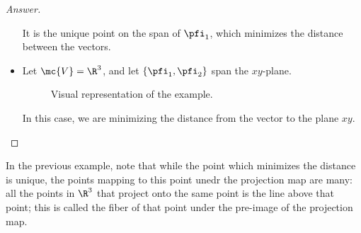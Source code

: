 \begin{proof}[Answer]
\begin{itemize}
        It is the unique point on the span of \(\pfi_1\), which minimizes the distance between the vectors.

        \item Let \(\mc{V}=\R^3\), and let \(\{\pfi_1,\pfi_2\}\) span the \(xy\)-plane.
        
        \begin{figure}[H]
            \centering
            \caption{Visual representation of the example.}
        \end{figure}

        In this case, we are minimizing the distance from the vector to the plane \(xy\).
    \end{itemize} 
\end{proof}
\begin{note}
    In the previous example, note that while the point which minimizes the distance is unique, the points mapping to this point unedr the projection map are many: all the points in \(\R^3\) that project onto the same point is the line above that point; this is called the fiber of that point under the pre-image of the projection map.
\end{note}

